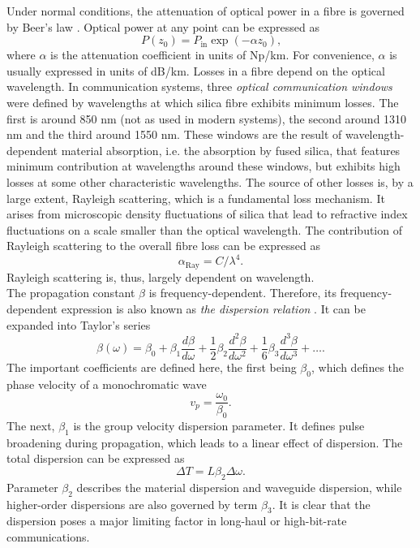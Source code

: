 \documentclass{standalone}
\begin{document}
Under normal conditions, the attenuation of optical power in a fibre is governed by Beer's law \cite{agrawal}. Optical power at any point can be expressed as
\begin{equation}
P(z_0) = P_\textrm{in} \exp\left(-\alpha z_0\right) \textrm{,}
\end{equation}
where $\alpha$ is the attenuation coefficient in units of Np/km. For convenience, $\alpha$ is usually expressed in units of dB/km. Losses in a fibre depend on the optical wavelength. In communication systems, three \emph{optical communication windows} were defined by wavelengths at which silica fibre exhibits minimum losses. The first is around 850 nm (not as used in modern systems), the second around 1310 nm and the third around 1550 nm. These windows are the result of wavelength-dependent material absorption, i.e. the absorption by fused silica, that features minimum contribution at wavelengths around these windows, but exhibits high losses at some other characteristic wavelengths. The source of other losses is, by a large extent, Rayleigh scattering, which is a fundamental loss mechanism. It arises from microscopic density fluctuations of silica that lead to refractive index fluctuations on a scale smaller than the optical wavelength. The contribution of Rayleigh scattering to the overall fibre loss can be expressed as
\begin{equation}
\alpha_\textrm{Ray} = C / \lambda^4 \textrm{.}
\end{equation}
Rayleigh scattering is, thus, largely dependent on wavelength. \\

The propagation constant $\beta$ is frequency-dependent. Therefore, its frequency-dependent expression is also known as \textit{the dispersion relation} \cite{chalmers:foc}. It can be expanded into Taylor's series
\begin{equation}
\beta(\omega) = \beta_0 + \beta_1 \frac{d \beta}{d \omega} + \frac{1}{2} \beta_2 \frac{d^2 \beta}{d \omega^2} + \frac{1}{6} \beta_3 \frac{d^3 \beta}{d \omega^3} + \dots \textrm{.}
\end{equation}
The important coefficients are defined here, the first being $\beta_0$, which defines the phase velocity of a monochromatic wave
\begin{equation}
v_p = \frac{\omega_0}{\beta_0} \textrm{.}
\end{equation}
The next, $\beta_1$ is the group velocity dispersion parameter. It defines pulse broadening during propagation, which leads to a linear effect of dispersion. The total dispersion can be expressed as
\begin{equation}
\varDelta T = L \beta_2 \varDelta \omega \textrm{.}
\end{equation}
Parameter $\beta_2$ describes the material dispersion and waveguide dispersion, while higher-order dispersions are also governed by term $\beta_3$. It is clear that the dispersion poses a major limiting factor in long-haul or high-bit-rate communications.
\end{document}
